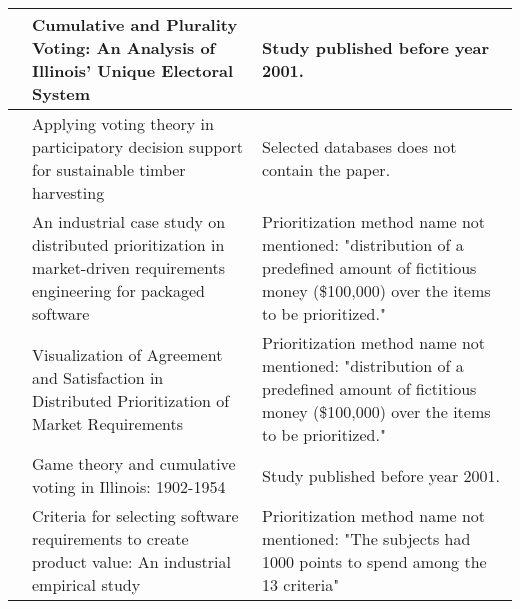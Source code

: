 \begin{table}[h!]
{\begin{tabular}{
|>{\raggedright}p{}
|>{\raggedright}p{}
|>{\raggedright}p{}
|}
\citet{Kuklinski1973} & Cumulative and Plurality Voting: An Analysis of Illinois' Unique Electoral System &
Study published before year 2001.
\tabularnewline \hline

\citet{Laukkanen2004} & Applying voting theory in participatory decision support for sustainable timber harvesting &
Selected databases does not contain the paper.
\tabularnewline \hline

\citet{Regnell2001} & An industrial case study on distributed prioritization in market-driven requirements engineering for packaged software &
Prioritization method name not mentioned: "distribution of a predefined amount of fictitious money (\$100,000) over the items to be prioritized."
\tabularnewline \hline

\citet{Regnell2000} & Visualization of Agreement and Satisfaction in Distributed Prioritization of Market Requirements &
Prioritization method name not mentioned: "distribution of a predefined amount of fictitious money (\$100,000) over the items to be prioritized."
\tabularnewline \hline

\citet{Sawyer1962} & Game theory and cumulative voting in Illinois: 1902-1954 &
Study published before year 2001.
\tabularnewline \hline

\citet{Wohlin2006} & Criteria for selecting software requirements to create product value: An industrial empirical study &
Prioritization method name not mentioned: "The subjects had 1000 points to spend among the 13 criteria"
\tabularnewline \hline

\end{tabular}
}
\end{table}